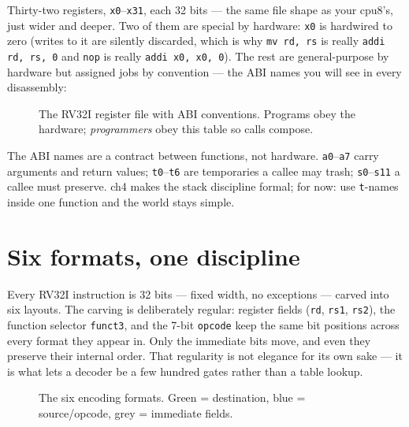 Thirty-two registers, \texttt{x0}--\texttt{x31}, each 32 bits --- the
same file shape as your cpu8's, just wider and deeper. Two of them are
special by hardware: \texttt{x0} is hardwired to zero (writes to it are
silently discarded, which is why \texttt{mv rd, rs} is really
\texttt{addi rd, rs, 0} and \texttt{nop} is really
\texttt{addi x0, x0, 0}). The rest are general-purpose by hardware but
assigned jobs by convention --- the ABI names you will see in every
disassembly:

\begin{figure}[htbp]
\centering

\caption{The RV32I register file with ABI conventions. Programs obey
the hardware; \emph{programmers} obey this table so calls compose.}
\label{fig:regs03}
\end{figure}

\begin{principle}
The ABI names are a contract between functions, not hardware.
\texttt{a0}--\texttt{a7} carry arguments and return values;
\texttt{t0}--\texttt{t6} are temporaries a callee may trash;
\texttt{s0}--\texttt{s11} a callee must preserve. ch4 makes the stack
discipline formal; for now: use \texttt{t}-names inside one function
and the world stays simple.
\end{principle}

\section{Six formats, one discipline}
\label{sec:formats03}

Every RV32I instruction is 32 bits --- fixed width, no exceptions ---
carved into six layouts. The carving is deliberately regular: register
fields (\texttt{rd}, \texttt{rs1}, \texttt{rs2}), the function selector
\texttt{funct3}, and the 7-bit \texttt{opcode} keep the same bit
positions across every format they appear in. Only the immediate bits
move, and even they preserve their internal order. That regularity is
not elegance for its own sake --- it is what lets a decoder be a few
hundred gates rather than a table lookup.

\begin{figure}[htbp]
\centering

\caption{The six encoding formats. Green = destination, blue =
source/opcode, grey = immediate fields.}
\label{fig:formats03}
\end{figure}

